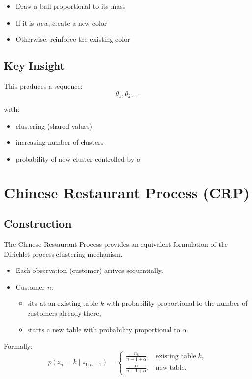 \documentclass[12pt,oneside]{book}
\numberwithin{equation}{section}
\theoremstyle{definition}
\theoremstyle{plain}
\theoremstyle{remark}
\begin{document}
\begin{itemize}
\item Draw a ball proportional to its mass
\item If it is \emph{new}, create a new color
\item Otherwise, reinforce the existing color
\end{itemize}

\subsection*{Key Insight}

This produces a sequence:
\[
\theta_1, \theta_2, \dots
\]

with:
\begin{itemize}
\item clustering (shared values)
\item increasing number of clusters
\item probability of new cluster controlled by $\alpha$
\end{itemize}

\section{Chinese Restaurant Process (CRP)}

\subsection*{Construction}

The Chinese Restaurant Process provides an equivalent formulation of the Dirichlet process clustering mechanism.

\begin{itemize}
\item Each observation (customer) arrives sequentially.
\item Customer $n$:
\begin{itemize}
\item sits at an existing table $k$ with probability proportional to the number of customers already there,
\item starts a new table with probability proportional to $\alpha$.
\end{itemize}
\end{itemize}

Formally:
\[
p(z_n = k \mid z_{1:n-1}) =
\begin{cases}
\frac{n_k}{n-1+\alpha}, & \text{existing table } k, \\
\frac{\alpha}{n-1+\alpha}, & \text{new table}.
\end{cases}
\]
\end{document}
